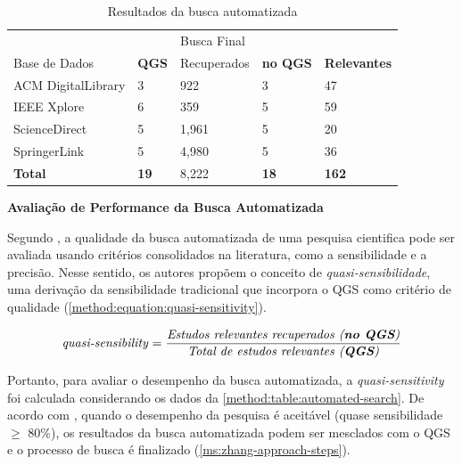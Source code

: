\begin{table}[htbp]
\centering
\caption{Resultados da busca automatizada}
\label{method:table:automated-search}
\begin{tabular}{lllll}
\hline
 &  & Busca Final &                 &                   \\ \cline{3-5} 
Base de Dados & \textbf{QGS} & Recuperados    & \textbf{no QGS} & \textbf{Relevantes} \\ \hline
ACM DigitalLibrary & 3            & 922          & 3               & 47                \\
IEEE Xplore        & 6            & 359          & 5               & 59                \\
ScienceDirect      & 5            & 1,961        & 5               & 20                \\
SpringerLink       & 5            & 4,980        & 5               & 36                \\
\textbf{Total}   & \textbf{19}  & 8,222        & \textbf{18}     & \textbf{162}      \\ \hline
\end{tabular}
\fautor
\end{table}

\noindent
\textbf{Avaliação de Performance da Busca Automatizada}

Segundo , a qualidade da busca automatizada de uma pesquisa cientifica pode ser avaliada usando critérios consolidados na literatura, como a sensibilidade e a precisão. Nesse sentido, os autores propõem o conceito de \textit{quasi-sensibilidade}, uma derivação da sensibilidade tradicional que incorpora o QGS como critério de qualidade (\autoref{method:equation:quasi-sensitivity}).

\begin{equation}
\label{method:equation:quasi-sensitivity}
\text{\textit{quasi-sensibility}} = \frac{\text{\textit{Estudos relevantes recuperados (\textbf{no QGS})}}}{\text{\textit{Total de estudos relevantes (\textbf{QGS})}}}
\end{equation}

Portanto, para avaliar o desempenho da busca automatizada, a \textit{quasi-sensitivity} foi calculada considerando os dados da \autoref{method:table:automated-search}. De acordo com , quando o desempenho da pesquisa é aceitável (quase sensibilidade $\geq$ 80\%), os resultados da busca automatizada podem ser mesclados com o QGS e o processo de busca é finalizado (\autoref{ms:zhang-approach-steps}).

